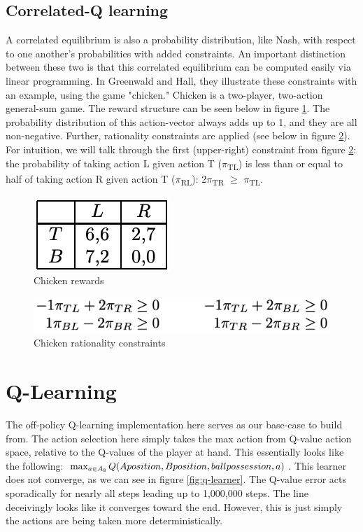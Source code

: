 \documentclass[conference]{IEEEtran}
\begin{document}
\subsection{Correlated-Q learning}
A correlated equilibrium is also a probability distribution, like Nash, with respect to one another's probabilities with added constraints. An important distinction between these two is that this correlated equilibrium can be computed easily via linear programming. In Greenwald and Hall, they illustrate these constraints with an example, using the game "chicken." Chicken is a two-player, two-action general-sum game. The reward structure can be seen below in figure \ref{fig:chicken-rewards}. The probability distribution of this action-vector always adds up to 1, and they are all non-negative. Further, rationality constraints are applied (see below in figure \ref{fig:chicken-rationality-constraints}). For intuition, we will talk through the first (upper-right) constraint from figure \ref{fig:chicken-rationality-constraints}: the probability of taking action L given action T ($\pi$\textsubscript{TL}) is less than or equal to half of taking action R given action T ($\pi$\textsubscript{RL}): 2$\pi$\textsubscript{TR} $\geq$ $\pi$\textsubscript{TL}.

\begin{figure}[]
    \centering
    \includegraphics[scale=0.45]{figs/chicken-rewards.png}
    \caption{Chicken rewards}
    \label{fig:chicken-rewards}
\end{figure}

\begin{figure}[]
    \centering
    \includegraphics[scale=0.45]{figs/chicken-rationality-constraints.png}
    \caption{Chicken rationality constraints}
    \label{fig:chicken-rationality-constraints}
\end{figure}

\section{Q-Learning}
The off-policy Q-learning implementation here serves as our base-case to build from. The action selection here simply takes the max action from Q-value action space, relative to the Q-values of the player at hand. This essentially looks like the following: $\max_{a \in A\textsubscript{s}} Q(A position, B position, ball possession, a)$. This learner does not converge, as we can see in figure \ref{fig:q-learner}. The Q-value error acts sporadically for nearly all steps leading up to 1,000,000 steps. The line deceivingly looks like it converges toward the end. However, this is just simply the actions are being taken more deterministically.
\end{document}
